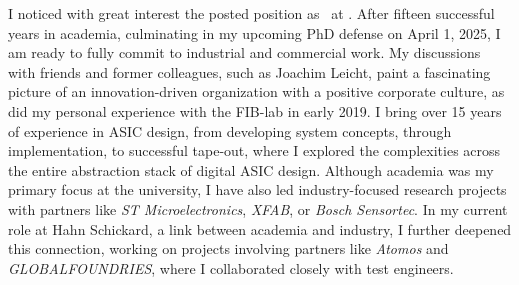 I noticed with great interest the posted position as \stelleText~at \firmaSatz. After fifteen successful years in academia, culminating in my upcoming PhD defense on April 1, 2025, I am ready to fully commit to industrial and commercial work. My discussions with friends and former colleagues, such as Joachim Leicht, paint a fascinating picture of an innovation-driven organization with a positive corporate culture, as did my personal experience with the FIB-lab in early 2019. I bring over 15 years of experience in ASIC design, from developing system concepts, through implementation, to successful tape-out, where I explored the complexities across the entire abstraction stack of digital ASIC design. Although academia was my primary focus at the university, I have also led industry-focused research projects with partners like \textit{ST Microelectronics}, \textit{XFAB}, or \textit{Bosch Sensortec}. In my current role at Hahn Schickard, a link between academia and industry, I further deepened this connection, working on projects involving partners like \textit{Atomos} and \textit{GLOBALFOUNDRIES}, where I collaborated closely with test engineers.\par
